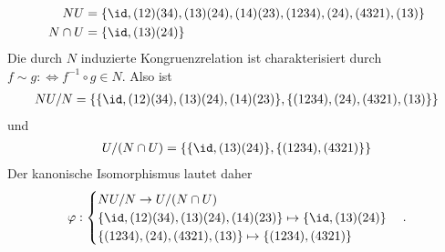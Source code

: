 \begin{solution}
\begin{align*}
  NU &= \{\id,(12)(34),(13)(24),(14)(23),(1234),(24),(4321),(13)\} \\
  N \cap U &= \{\id, (13)(24) \} \\
\end{align*}
Die durch $N$ induzierte Kongruenzrelation ist charakterisiert durch
$f \sim g :\iff f^{-1}\circ g \in N$.
Also ist
\begin{align*}
  NU/N = \{ \{\id, (12)(34), (13)(24), (14)(23)\}, \{(1234),(24),(4321),(13)\}\}
\end{align*}
und
\begin{align*}
  U/(N \cap U) = \{\{\id, (13)(24)\}, \{(1234), (4321)\}\}
\end{align*}
Der kanonische Isomorphismus lautet daher
\begin{align*}
  \varphi: \begin{cases}
    NU/N \rightarrow U/(N \cap U) \\
    \{\id, (12)(34), (13)(24), (14)(23)\} \mapsto \{\id, (13)(24)\} \\
    \{(1234),(24),(4321),(13)\} \mapsto \{(1234), (4321)\}
  \end{cases}.
\end{align*}
\end{solution}
